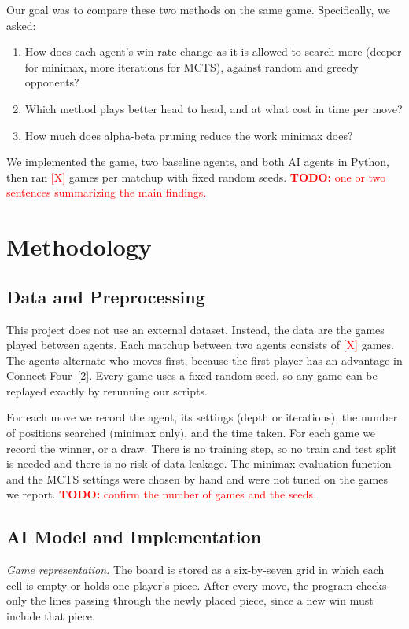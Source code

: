 \documentclass[10pt,twocolumn,letterpaper]{article}
\newcommand{\todo}[1]{\textcolor{red}{\textbf{TODO:} #1}}
\newcommand{\X}{\textcolor{red}{[X]}}
\begin{document}
Our goal was to compare these two methods on the same game. Specifically, we asked:
\begin{enumerate}[leftmargin=*,nosep]
  \item How does each agent's win rate change as it is allowed to search more (deeper for
        minimax, more iterations for MCTS), against random and greedy opponents?
  \item Which method plays better head to head, and at what cost in time per move?
  \item How much does alpha-beta pruning reduce the work minimax does?
\end{enumerate}
We implemented the game, two baseline agents, and both AI agents in Python, then ran \X{}
games per matchup with fixed random seeds. \todo{one or two sentences summarizing the main
findings.}

\section{Methodology}

\subsection{Data and Preprocessing}

This project does not use an external dataset. Instead, the data are the games played
between agents. Each matchup between two agents consists of \X{} games. The agents alternate
who moves first, because the first player has an advantage in Connect Four~[2]. Every game
uses a fixed random seed, so any game can be replayed exactly by rerunning our scripts.

For each move we record the agent, its settings (depth or iterations), the number of
positions searched (minimax only), and the time taken. For each game we record the winner,
or a draw. There is no training step, so no train and test split is needed and there is no
risk of data leakage. The minimax evaluation function and the MCTS settings were chosen by
hand and were not tuned on the games we report. \todo{confirm the number of games and the
seeds.}

\subsection{AI Model and Implementation}

\textit{Game representation.} The board is stored as a six-by-seven grid in which each cell
is empty or holds one player's piece. After every move, the program checks only the lines
passing through the newly placed piece, since a new win must include that piece.
\end{document}
